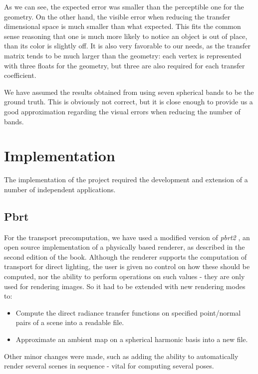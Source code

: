 \documentclass[annual]{acmsiggraph}
\begin{document}
As we can see, the expected error was smaller than the perceptible one for the geometry. On the other hand, the visible error when reducing the transfer dimensional space is much smaller than what expected. This fits the common sense reasoning that one is much more likely to notice an object is out of place, than its color is slightly off. It is also very favorable to our needs, as the transfer matrix tends to be much larger than the geometry: each vertex is represented with three floats for the geometry, but three are also required for each transfer coefficient.

We have assumed the results obtained from using seven spherical bands to be the ground truth. This is obviously not correct, but it is close enough to provide us a good approximation regarding the visual errors when reducing the number of bands.

\section{Implementation}

The implementation of the project required the development and extension of a number of independent applications.

\subsection{Pbrt}
For the transport precomputation, we have used a modified version of \emph{pbrt2} , an open source implementation of a physically based renderer, as described in the second edition of the book. Although the renderer supports the computation of transport for direct lighting, the user is given no control on how these should be computed, nor the ability to perform operations on such values - they are only used for rendering images. So it had to be extended with new rendering modes to:

\begin{itemize}
	\item Compute the direct radiance transfer functions on specified point/normal pairs of a scene into a readable file.
	\item Approximate an ambient map on a spherical harmonic basis into a new file.
\end{itemize}

Other minor changes were made, such as adding the ability to automatically render several scenes in sequence -  vital for computing several poses.
\end{document}
